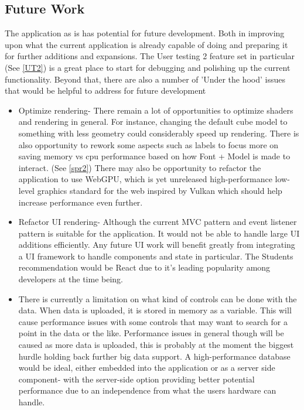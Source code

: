 \subsection{Future Work}
The application as is has potential for future development. Both in improving upon what the current application is already capable of doing and preparing it for further additions and expansions. The User testing 2 feature set in particular (See \ref{UT2}) is a great place to start for debugging and polishing up the current functionality. Beyond that, there are also a number of 'Under the hood' issues that would be helpful to address for future development
\begin{itemize}
    \item Optimize rendering- There remain a lot of opportunities to optimize shaders and rendering in general. For instance, changing the default cube model to something with less geometry could considerably speed up rendering. There is also opportunity to rework some aspects such as labels to focus more on saving memory vs cpu performance based on how Font + Model is made to interact. (See \ref{spr2}) There may also be opportunity to refactor the application to use WebGPU, which is yet unreleased high-performance low-level graphics standard for the web inspired by Vulkan which should help increase performance even further. \cite{w3c_2023_webgpu} \cite{mozilla_webgpu}
    \item Refactor UI rendering- Although the current MVC pattern and event listener pattern is suitable for the application. It would not be able to handle large UI additions efficiently. Any future UI work will benefit greatly from integrating a UI framework to handle components and state in particular. The Students recommendation would be React due to it's leading popularity among developers at the time being. \cite[]{stackoverflow_2021_stack}
    \item There is currently a limitation on what kind of controls can be done with the data. When data is uploaded, it is stored in memory as a variable. This will cause performance issues with some controls that may want to search for a point in the data or the like. Performance issues in general though will be caused as more data is uploaded, this is probably at the moment the biggest hurdle holding back further big data support. A high-performance database would be ideal, either embedded into the application or as a server side component- with the server-side option providing better potential performance due to an independence from what the users hardware can handle.
\end{itemize}

